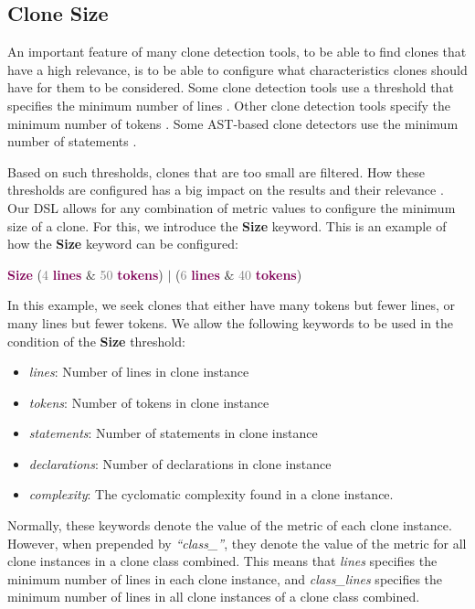 \documentclass[sigplan,10pt,review,anonymous]{acmart}
\begin{document}
\subsection{Clone Size}
An important feature of many clone detection tools, to be able to find clones that have a high relevance, is to be able to configure what characteristics clones should have for them to be considered. Some clone detection tools use a threshold that specifies the minimum number of lines \cite{juergens2009clonedetective, ducasse1999language, cordy2011nicad, uddin2013simcad}. Other clone detection tools specify the minimum number of tokens \cite{kamiya2002ccfinder, toomey2012ctcompare, jiang2007deckard}. Some AST-based clone detectors use the minimum number of statements \cite{higo2009enhancing}.

Based on such thresholds, clones that are too small are filtered. How these thresholds are configured has a big impact on the results and their relevance \cite{roy2007survey}. Our DSL allows for any combination of metric values to configure the minimum size of a clone. For this, we introduce the \textbf{Size} keyword. This is an example of how the \textbf{Size} keyword can be configured:

\noindent\makebox[\linewidth]{\rule{\linewidth}{0.4pt}}
\textbf{\textcolor[HTML]{7F0055}{Size}} (\textcolor[HTML]{7D7D7D}{4} \textbf{\textcolor[HTML]{7F0055}{lines}} $\&$  \textcolor[HTML]{7D7D7D}{50} \textbf{\textcolor[HTML]{7F0055}{tokens}}) $ \vert $  (\textcolor[HTML]{7D7D7D}{6} \textbf{\textcolor[HTML]{7F0055}{lines}} $\&$  \textcolor[HTML]{7D7D7D}{40} \textbf{\textcolor[HTML]{7F0055}{tokens}})\\
\noindent\makebox[\linewidth]{\rule{\linewidth}{0.4pt}}

In this example, we seek clones that either have many tokens but fewer lines, or many lines but fewer tokens. We allow the following keywords to be used in the condition of the \textbf{Size} threshold:
\begin{itemize}
  \item \textit{lines}: Number of lines in clone instance
  \item \textit{tokens}: Number of tokens in clone instance
  \item \textit{statements}: Number of statements in clone instance
  \item \textit{declarations}: Number of declarations in clone instance
  \item \textit{complexity}: The cyclomatic complexity \cite{mccabe1976complexity} found in a clone instance.
\end{itemize}
Normally, these keywords denote the value of the metric of each clone instance. However, when prepended by \textit{``class\_''}, they denote the value of the metric for all clone instances in a clone class combined. This means that \textit{lines} specifies the minimum number of lines in each clone instance, and \textit{class\_lines} specifies the minimum number of lines in all clone instances of a clone class combined.
\end{document}
